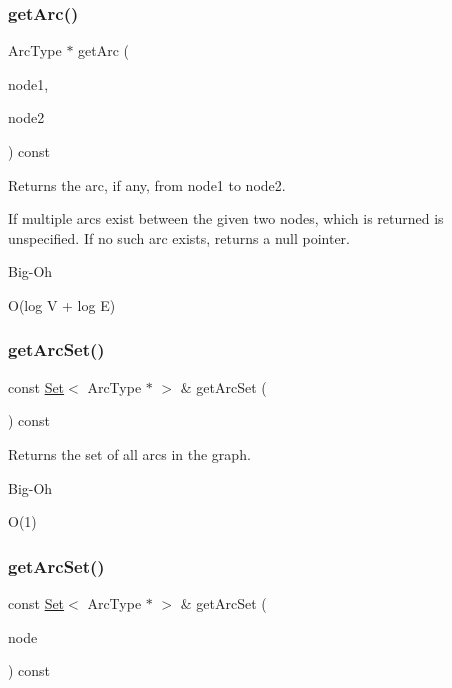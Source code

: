 \subsubsection{\texorpdfstring{get\+Arc()}{getArc()}\hspace{0.1cm}{\footnotesize\ttfamily [2/2]}}
{\footnotesize\ttfamily Arc\+Type $\ast$ get\+Arc (\begin{DoxyParamCaption}\item[{const std\+::string \&}]{node1,  }\item[{const std\+::string \&}]{node2 }\end{DoxyParamCaption}) const}



Returns the arc, if any, from node1 to node2. 

If multiple arcs exist between the given two nodes, which is returned is unspecified. If no such arc exists, returns a null pointer. \begin{DoxyRefDesc}{Big-\/\+Oh}
\item[\mbox{\hyperlink{BigOh__BigOh000061}{Big-\/\+Oh}}]O(log V + log E) \end{DoxyRefDesc}
\mbox{\label{classGraph_a0690edaeae8d5256189ae2e8541788b5}} 
\subsubsection{\texorpdfstring{get\+Arc\+Set()}{getArcSet()}\hspace{0.1cm}{\footnotesize\ttfamily [1/3]}}
{\footnotesize\ttfamily const \mbox{\hyperlink{classSet}{Set}}$<$ Arc\+Type $\ast$ $>$ \& get\+Arc\+Set (\begin{DoxyParamCaption}{ }\end{DoxyParamCaption}) const}



Returns the set of all arcs in the graph. 

\begin{DoxyRefDesc}{Big-\/\+Oh}
\item[\mbox{\hyperlink{BigOh__BigOh000062}{Big-\/\+Oh}}]O(1) \end{DoxyRefDesc}
\mbox{\label{classGraph_a17cfc7f4d8c738fc6f51813f50be6400}} 
\subsubsection{\texorpdfstring{get\+Arc\+Set()}{getArcSet()}\hspace{0.1cm}{\footnotesize\ttfamily [2/3]}}
{\footnotesize\ttfamily const \mbox{\hyperlink{classSet}{Set}}$<$ Arc\+Type $\ast$ $>$ \& get\+Arc\+Set (\begin{DoxyParamCaption}\item[{Node\+Type $\ast$}]{node }\end{DoxyParamCaption}) const}



